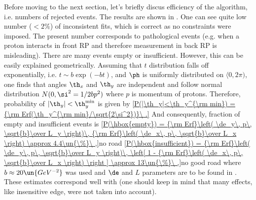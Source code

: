 Before moving to the next section, let's briefly discus efficiency of the algorithm, i.e. numbers of rejected events. The results are shown in . One can see quite low number ($< 2\%$) of inconsistent fits, which is correct as no constraints were imposed. The present number corresponds to pathological events (e.g. when a proton interacts in front RP and therefore measurement in back RP is misleading). There are many events empty or insufficient. However, this can be easily explained geometrically. Assuming that $t$ distribution falls off exponentially, i.e. $t\sim b\exp(-bt)$, and $\ph$ is uniformly distributed on $\langle 0, 2\pi)$, one finds that angles $\th_x$ and $\th_y$ are independent and follow normal distribution $N(0, \si^2 = 1/2bp^2)$ where $p$ is momentum of protons. Therefore, probability of $|\th_y|<\th_y^{\rm min}$ is given by
\eqref{P(|\th_y|<\th_y^{\rm min}) = {\rm Erf(\th_y^{\rm min}/\sqrt{2\si^2})}\ .}{}
And consequently, fraction of empty and insufficient events is
\eqref{P(\hbox{empty}) = {\rm Erf}\left( \de_y\, p\, \sqrt{b}\over L_y \right)\, {\rm Erf}\left( \de_x\, p\, \sqrt{b}\over L_x \right) \approx 4.4\un{\%}\ ,}{no road}
\eqref{P(\hbox{insufficient}) = {\rm Erf}\left( \de_y\, p\, \sqrt{b}\over L_y \right)\, \left[ 1 - {\rm Erf}\left( \de_x\, p\, \sqrt{b}\over L_x \right) \right ] \approx 13\un{\%}\ ,}{no good road}
where $b \approx 20\un{GeV^{-2}}$ was used and $\de$ and $L$ parameters are to be found in . These estimates correspond well with  (one should keep in mind that many effects, like insensitive edge, were not taken into account).




